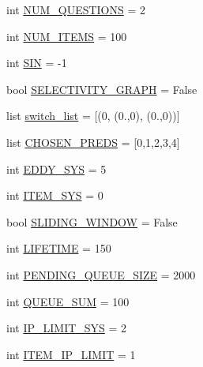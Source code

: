 \begin{DoxyCompactItemize}
\item 
int \mbox{\hyperlink{namespacedynamicfilterapp_1_1toggles_a6e9b8f89b507e81efe828c45c51e3906}{N\+U\+M\+\_\+\+Q\+U\+E\+S\+T\+I\+O\+NS}} = 2
\item 
int \mbox{\hyperlink{namespacedynamicfilterapp_1_1toggles_a0948720f253a5f2fc7689b2968c8b619}{N\+U\+M\+\_\+\+I\+T\+E\+MS}} = 100
\item 
int \mbox{\hyperlink{namespacedynamicfilterapp_1_1toggles_a46cfe1555e9636aa02be672a0dbfcee8}{S\+IN}} = -\/1
\item 
bool \mbox{\hyperlink{namespacedynamicfilterapp_1_1toggles_a7bfe56554845cde1c15e59ba47f471ed}{S\+E\+L\+E\+C\+T\+I\+V\+I\+T\+Y\+\_\+\+G\+R\+A\+PH}} = False
\item 
list \mbox{\hyperlink{namespacedynamicfilterapp_1_1toggles_abbafede9e00a5523a3cfea9fc4ff4764}{switch\+\_\+list}} = \mbox{[}(0, (0.,0), (0.,0))\mbox{]}
\item 
list \mbox{\hyperlink{namespacedynamicfilterapp_1_1toggles_a1e059d484294d0a2661de21590419600}{C\+H\+O\+S\+E\+N\+\_\+\+P\+R\+E\+DS}} = \mbox{[}0,1,2,3,4\mbox{]}
\item 
int \mbox{\hyperlink{namespacedynamicfilterapp_1_1toggles_a549d2c90f3f5922ad1442df2113fca1b}{E\+D\+D\+Y\+\_\+\+S\+YS}} = 5
\item 
int \mbox{\hyperlink{namespacedynamicfilterapp_1_1toggles_ae8b7db6fd373a0c3225ad361f894aee2}{I\+T\+E\+M\+\_\+\+S\+YS}} = 0
\item 
bool \mbox{\hyperlink{namespacedynamicfilterapp_1_1toggles_adf3c8ab64e62d33397a389d7ba49fe69}{S\+L\+I\+D\+I\+N\+G\+\_\+\+W\+I\+N\+D\+OW}} = False
\item 
int \mbox{\hyperlink{namespacedynamicfilterapp_1_1toggles_a06966aed6fa634825f18ad256f386496}{L\+I\+F\+E\+T\+I\+ME}} = 150
\item 
int \mbox{\hyperlink{namespacedynamicfilterapp_1_1toggles_a642cb0e1f266db761b270ea65af5425a}{P\+E\+N\+D\+I\+N\+G\+\_\+\+Q\+U\+E\+U\+E\+\_\+\+S\+I\+ZE}} = 2000
\item 
int \mbox{\hyperlink{namespacedynamicfilterapp_1_1toggles_a472153a69096a3f18b32cd5ac247f658}{Q\+U\+E\+U\+E\+\_\+\+S\+UM}} = 100
\item 
int \mbox{\hyperlink{namespacedynamicfilterapp_1_1toggles_ab27926159525360b29661a4778b0ce7c}{I\+P\+\_\+\+L\+I\+M\+I\+T\+\_\+\+S\+YS}} = 2
\item 
int \mbox{\hyperlink{namespacedynamicfilterapp_1_1toggles_a755f2e9edbb8b4d5039a950757b9cfb2}{I\+T\+E\+M\+\_\+\+I\+P\+\_\+\+L\+I\+M\+IT}} = 1
\item 

\end{DoxyCompactItemize}
